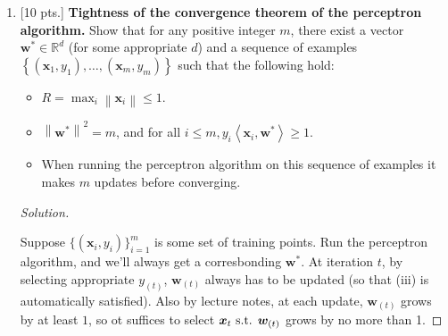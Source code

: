 \documentclass[12pt,letterpaper]{article}
\newenvironment{solution}{%
  \begin{proof}[Solution]$ $\par\nobreak\ignorespaces
}{%
  \end{proof}
}
\def \w{\boldsymbol{w}}
\def \x{\boldsymbol{x}}
\begin{document}
\begin{enumerate}
\begin{solution}
\begin{itemize}
    Take $H=\tilde H\cup \tilde H'$, and we see that $|H_{C}|=|Y_{0}|+|Y_{1}|=\leq \mid\left\{B \subseteq C: c_{1} \notin B \wedge \tilde{\mathcal{H}} \text { shatters } B\right\}|+|\left\{B \subseteq C: c_{1} \in B \wedge \tilde{\mathcal{H}} \text { shatters } B\right\} \mid 
=\mid\{B \subseteq C: \mathcal{H} \text { shatters } B\} \mid
\end{aligned}$
\end{itemize}

In conclusion, we've proved that Sauer's lemma is tight.
\end{solution}



\item {[10 pts.]} {\bf Tightness of the convergence theorem of the perceptron algorithm.} Show that for any positive integer $m$, there exist a vector $\bm{w}^{*} \in \mathbb{R}^{d}$ (for some appropriate $d$) and a sequence of examples $\left\{\left(\bm{x}_{1}, y_{1}\right), \ldots,\left(\bm{x}_{m}, y_{m}\right)\right\}$ such that the following hold:
\begin{itemize}
    \item  $R=\max _{i}\left\|\bm{x}_{i}\right\| \leq 1$.
    \item $\left\|\bm{w}^{*}\right\|^{2}=m$, and for all $i \leq m, y_{i}\left\langle\bm{x}_{i}, \bm{w}^{*}\right\rangle \geq 1$.
    \item When running the perceptron algorithm on this sequence of examples it makes $m$ updates before converging.
\end{itemize}


\begin{solution}

  Suppose $\{(\x_{i},y_{i})\}_{i=1}^{m}$ is some set of training points. Run the perceptron algorithm, and we'll always get a corresbonding $\w^{*}$. At iteration $t$, by selecting appropriate $y_{(t)}$, $\w_{(t)}$ always has to be updated (so that (iii) is automatically satisfied). Also by lecture notes, at each update, $\w_{(t)}$ grows by at least $1$, so ot suffices to select $\x_{t}\st \w_{(t)}$ grows by no more than 1.


\end{solution}
\end{enumerate}
\end{document}
